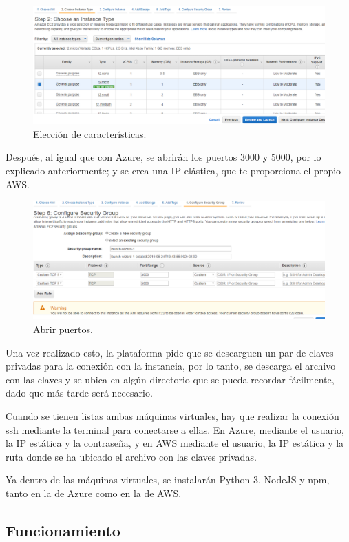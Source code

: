 \documentclass[10pt]{article}
\begin{document}
\begin{figure}[h!]
 \includegraphics[width=\linewidth]{./Web/AWS/AWS2.png}
 \caption{Elección de características.}
\end{figure}

Después, al igual que con Azure, se abrirán los puertos 3000 y 5000, por lo
explicado anteriormente; y se crea una IP elástica, que te proporciona el propio
AWS.

\begin{figure}[h!]
 \includegraphics[width=\linewidth]{./Web/AWS/AWS3.png}
 \caption{Abrir puertos.}
\end{figure}

Una vez realizado esto, la plataforma pide que se descarguen un par de claves
privadas para la conexión con la instancia, por lo tanto, se descarga el archivo
con las claves y se ubica en algún directorio que se pueda recordar fácilmente,
dado que más tarde será necesario.

Cuando se tienen listas ambas máquinas virtuales, hay que realizar la conexión ssh
mediante la terminal para conectarse a ellas. En Azure, mediante el usuario, la IP
estática y la contraseña, y en AWS mediante el usuario, la IP estática y la ruta
donde se ha ubicado el archivo con las claves privadas.

Ya dentro de las máquinas virtuales, se instalarán Python 3, NodeJS y npm, tanto en
la de Azure como en la de AWS.

\subsection{Funcionamiento}
\end{document}
